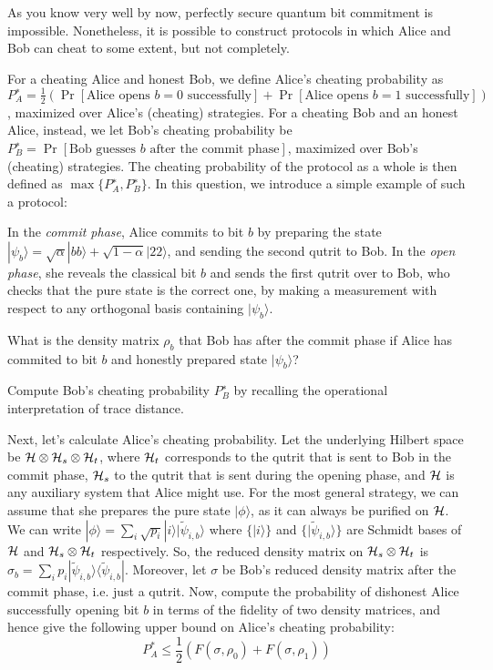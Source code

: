 \documentclass[a4paper,10pt,landscape,twocolumn]{scrartcl}
\newcommand{\ket}[1]{| #1 \rangle}
\newcommand{\bra}[1]{\langle #1 |}
\begin{document}
\begin{exercise}
\begin{subex}
As you know very well by now, perfectly secure quantum bit commitment is impossible. Nonetheless, it is possible to construct protocols in which Alice and Bob can cheat to some extent, but not completely. 

For a cheating Alice and honest Bob, we define Alice's cheating probability as $P_A^∗ = \frac12(\Pr[\text{Alice opens $b=0$ successfully}]+ \Pr[\text{Alice opens $b=1$ successfully}])$, maximized over Alice's (cheating) strategies. For a cheating Bob and an honest Alice, instead, we let Bob's cheating probability be
$P_B^∗= \Pr[\text{Bob guesses $b$ after the commit phase}]$, maximized over Bob's (cheating) strategies. The cheating probability of the protocol as a whole is then defined as $\max\{P_A^∗,P_B^∗\}$. In this question, we introduce a simple example of such a protocol:

In the \emph{commit phase}, Alice commits to bit $b$ by preparing the state 
$\ket{\psi_b}= \sqrt{\alpha} \ket{bb} + \sqrt{1-\alpha} \ket{22}$, and sending the second qutrit to Bob. In the \emph{open phase}, she reveals the classical bit $b$ and sends the first qutrit over to Bob, who checks that the pure state is the correct one, by making a measurement with respect to any orthogonal basis containing $\ket{\psi_b}$.

What is the density matrix $\rho_b$ that Bob has after the commit phase if Alice has commited to bit $b$ and honestly prepared state $\ket{\psi_b}$?
\end{subex}

\begin{subex} \label{subex:bob}
Compute Bob's cheating probability $P_B^∗$ by recalling the operational interpretation of trace distance.
\end{subex}

\begin{subex}
Next, let's calculate Alice's cheating probability. Let the underlying Hilbert space be $\mathcal{H} \otimes \mathcal{H}_s \otimes \mathcal{H}_t$, where $\mathcal{H}_t$ corresponds to the qutrit that is sent to Bob in the commit phase, $\mathcal{H}_s$ to the qutrit that is sent during the opening phase, and $\mathcal{H}$ is any auxiliary system that Alice might use. For the most general strategy, we can assume that she prepares the pure state $\ket{\phi}$, as it can always be purified on $\mathcal{H}$.
We can write $\ket{\phi} = \sum_i \sqrt{p_i} \ket{i} \ket{\tilde{\psi}_{i,b}}$ where $\{\ket{i}\}$ and $\{ \ket{\tilde{\psi}_{i,b}} \}$ are Schmidt bases of $\mathcal{H}$ and $\mathcal{H}_s \otimes \mathcal{H}_t$ respectively. So, the reduced density matrix on $\mathcal{H}_s \otimes \mathcal{H}_t$ is $\sigma_b = \sum_i p_i \ket{\tilde{\psi}_{i,b}}\bra{\tilde{\psi}_{i,b}}$. Moreover, let $\sigma$ be Bob's reduced density matrix after the commit phase, i.e. just a qutrit.
Now, compute the probability of dishonest Alice successfully opening bit $b$ in terms of the fidelity of two density matrices, and hence give the following upper bound on Alice's cheating probability:
\[
P_A^* \leq \frac12 \left( F(\sigma, \rho_0) + F(\sigma,\rho_1) \right)
\]


\end{subex}
\end{exercise}
\end{document}
